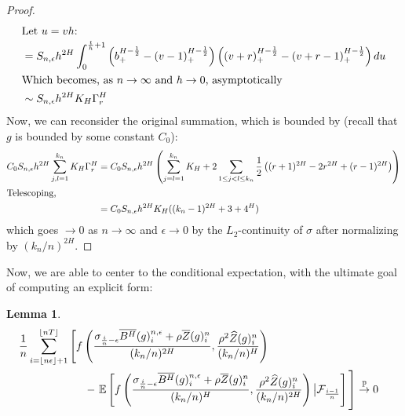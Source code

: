 \documentclass[12pt,letterpaper]{article}
\newtheorem{lemma}{Lemma}
\theoremstyle{definition}
\newcommand{\E}{\mathbb{E}}
\begin{document}
\begin{proof}
\begin{align}
    \intertext{Let \(u = vh\):}
    &= S_{n,\epsilon} h^{2H}\int_{0}^{\frac{t}{h}+1}\left( b_{+}^{H - \frac{1}{2}} - (v - 1)_{+}^{H - \frac{1}{2}}\right)\left( (v + r)_{+}^{H - \frac{1}{2}} - (v + r-1)_{+}^{H - \frac{1}{2}} \right)du \\
    \intertext{Which becomes, as \(n \rightarrow \infty\) and \(h \rightarrow 0\), asymptotically}
    &\sim S_{n,\epsilon} h^{2H}K_{H}\Gamma_{r}^{H}
  \end{align}
  Now, we can reconsider the original summation, which is bounded by (recall that \(g\) is bounded by some constant \(C_{0}\)):
  \begin{align}
    C_{0}S_{n,\epsilon} h^{2H}\sum_{j,l=1}^{k_{n}}K_{H}\Gamma_{r}^{H} &= C_{0}S_{n,\epsilon}h^{2H} \left(\sum_{j=l=1}^{k_{n}}K_{H} + 2\sum_{1 \leq j < l \leq k_{n}}\frac{1}{2}\left( (r+1)^{2H} - 2r^{2H} + (r-1)^{2H} \right)\right) \\
    \intertext{Telescoping,}
                                                                      &= C_{0}S_{n,\epsilon}h^{2H} K_{H}((k_{n}-1)^{2H} + 3 + 4^{H})
  \end{align}
  which goes \(\rightarrow 0\) as \(n \rightarrow \infty\) and \(\epsilon \rightarrow 0\) by the \(L_{2}\)-continuity of \(\sigma\) after normalizing by \((k_{n}/n)^{2H}\).
\end{proof}

Now, we are able to center to the conditional expectation, with the ultimate goal of computing an explicit form:
\begin{lemma}
  \begin{align}
    \phantom{}
    &\begin{aligned}
      \mathllap{} &\frac{1}{n}\sum_{i = \left\lfloor n\epsilon \right\rfloor + 1}^{\left\lfloor nT \right\rfloor} \left[ \vphantom{\E \left[ f\left( \frac{\sigma_{\frac{i}{n}-\epsilon}\overline{B^H}(g)^{n,\epsilon}_i + \rho\overline{Z}(g)^n_i}{(k_n/n)^{2H}}, \frac{\rho^2\widehat{Z}(g)^n_i}{(k_n/n)^H}\right) \right] } f\left( \frac{\sigma_{\frac{i}{n}-\epsilon}\overline{B^H}(g)^{n,\epsilon}_i + \rho\overline{Z}(g)^n_i}{(k_n/n)^{2H}}, \frac{\rho^2\widehat{Z}(g)^n_i}{(k_n/n)^H}\right) \right. \\ &\hspace*{2.1cm} - \left. \E\left[ f\left( \frac{\sigma_{\frac{i}{n}-\epsilon}\overline{B^H}(g)^{n,\epsilon}_i + \rho\overline{Z}(g)^n_i}{(k_n/n)^{H}}, \frac{\rho^2\widehat{Z}(g)^n_i}{(k_n/n)^{2H}}\right) \big| \mathcal{F}_{\frac{i-1}{n}} \right] \vphantom{\frac{1}{n}\sum_{i = \left\lfloor n\epsilon \right\rfloor + 1}^{\left\lfloor nT \right\rfloor}} \right] \overset{\mathbb{P}}{\rightarrow} 0
    \end{aligned}
  \end{align}
\end{lemma}
\end{document}
